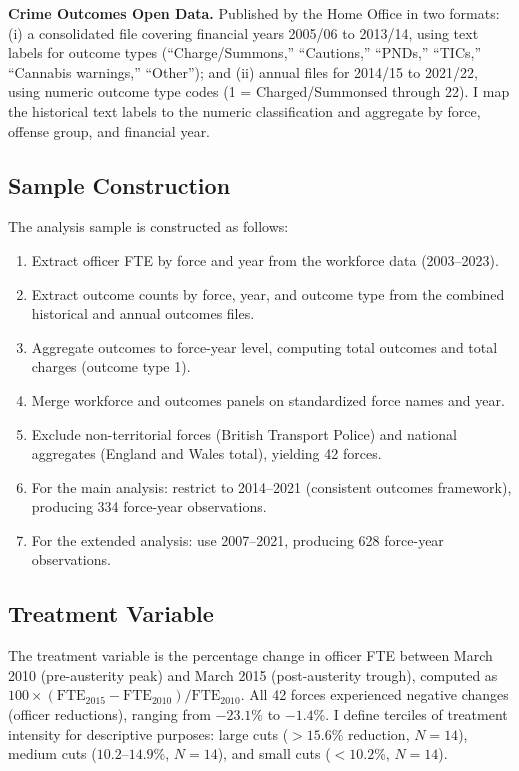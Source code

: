 \documentclass[12pt]{article}
\begin{document}
\textbf{Crime Outcomes Open Data.} Published by the Home Office in two formats: (i) a consolidated file covering financial years 2005/06 to 2013/14, using text labels for outcome types (``Charge/Summons,'' ``Cautions,'' ``PNDs,'' ``TICs,'' ``Cannabis warnings,'' ``Other''); and (ii) annual files for 2014/15 to 2021/22, using numeric outcome type codes (1 = Charged/Summonsed through 22). I map the historical text labels to the numeric classification and aggregate by force, offense group, and financial year.

\subsection{Sample Construction}

The analysis sample is constructed as follows:
\begin{enumerate}
\item Extract officer FTE by force and year from the workforce data (2003--2023).
\item Extract outcome counts by force, year, and outcome type from the combined historical and annual outcomes files.
\item Aggregate outcomes to force-year level, computing total outcomes and total charges (outcome type 1).
\item Merge workforce and outcomes panels on standardized force names and year.
\item Exclude non-territorial forces (British Transport Police) and national aggregates (England and Wales total), yielding 42 forces.
\item For the main analysis: restrict to 2014--2021 (consistent outcomes framework), producing 334 force-year observations.
\item For the extended analysis: use 2007--2021, producing 628 force-year observations.
\end{enumerate}

\subsection{Treatment Variable}

The treatment variable is the percentage change in officer FTE between March 2010 (pre-austerity peak) and March 2015 (post-austerity trough), computed as $100 \times (\text{FTE}_{2015} - \text{FTE}_{2010}) / \text{FTE}_{2010}$. All 42 forces experienced negative changes (officer reductions), ranging from $-23.1$\% to $-1.4$\%. I define terciles of treatment intensity for descriptive purposes: large cuts ($> 15.6$\% reduction, $N = 14$), medium cuts ($10.2$--$14.9$\%, $N = 14$), and small cuts ($< 10.2$\%, $N = 14$).
\end{document}
